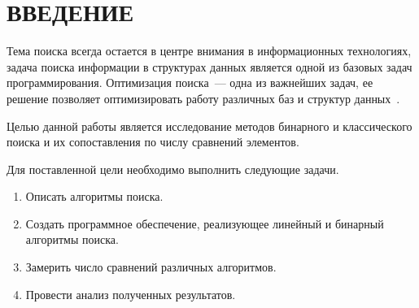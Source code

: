 \chapter*{\hfill{\centering  ВВЕДЕНИЕ}\hfill}


Тема поиска всегда остается в центре внимания в информационных технологиях, задача поиска информации в структурах данных является одной из базовых задач программирования. Оптимизация поиска~--- одна из важнейших задач, ее решение позволяет оптимизировать работу различных баз и структур данных~\cite{book_knut}.



Целью данной работы является исследование методов бинарного и классического поиска и их сопоставления по числу сравнений элементов.

\label{sec:targets}
Для поставленной цели необходимо выполнить следующие задачи.
\begin{enumerate}
	\item Описать алгоритмы поиска.
	\item Создать программное обеспечение, реализующее линейный и бинарный алгоритмы поиска.
	\item Замерить число сравнений различных алгоритмов.
	\item Провести анализ полученных результатов.
\end{enumerate}




